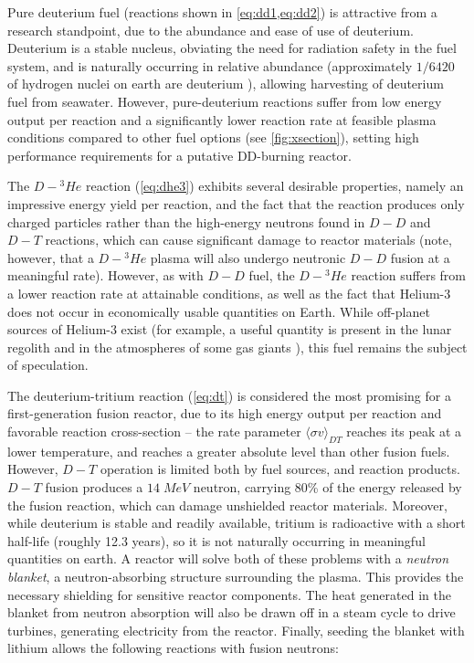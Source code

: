 Pure deuterium fuel (reactions shown in \cref{eq:dd1,eq:dd2}) is attractive from a research standpoint, due to the abundance and ease of use of deuterium.  Deuterium is a stable nucleus, obviating the need for radiation safety in the fuel system, and is naturally occurring in relative abundance (approximately $1/6420$ of hydrogen nuclei on earth are deuterium \cite{CRC}), allowing harvesting of deuterium fuel from seawater.  However, pure-deuterium reactions suffer from low energy output per reaction and a significantly lower reaction rate at feasible plasma conditions compared to other fuel options (see \cref{fig:xsection}), setting high performance requirements for a putative DD-burning reactor.

The $\si{D}-{}^3\si{He}$ reaction (\cref{eq:dhe3}) exhibits several desirable properties, namely an impressive energy yield per reaction, and the fact that the reaction produces only charged particles rather than the high-energy neutrons found in $\si{D}-\si{D}$ and $\si{D}-\si{T}$ reactions, which can cause significant damage to reactor materials (note, however, that a $\si{D}-{}^3\si{He}$ plasma will also undergo neutronic $\si{D}-\si{D}$ fusion at a meaningful rate).  However, as with $\si{D}-\si{D}$ fuel, the $\si{D}-{}^3\si{He}$ reaction suffers from a lower reaction rate at attainable conditions, as well as the fact that Helium-3 does not occur in economically usable quantities on Earth.  While off-planet sources of Helium-3 exist (for example, a useful quantity is present in the lunar regolith \cite{Johnson1999} and in the atmospheres of some gas giants \cite{Palaszewski2005}), this fuel remains the subject of speculation.

The deuterium-tritium reaction (\cref{eq:dt}) is considered the most promising for a first-generation fusion reactor, due to its high energy output per reaction and favorable reaction cross-section -- the rate parameter $\langle \sigma v \rangle_{DT}$ reaches its peak at a lower temperature, and reaches a greater absolute level than other fusion fuels.  However, $\si{D}-\si{T}$ operation is limited both by fuel sources, and reaction products.  $\si{D}-\si{T}$ fusion produces a $14 \;\si{MeV}$ neutron, carrying 80\% of the energy released by the fusion reaction, which can damage unshielded reactor materials.  Moreover, while deuterium is stable and readily available, tritium is radioactive with a short half-life (roughly 12.3 years), so it is not naturally occurring in meaningful quantities on earth.   A reactor will solve both of these problems with a \emph{neutron blanket}, a neutron-absorbing structure surrounding the plasma.  This provides the necessary shielding for sensitive reactor components.  The heat generated in the blanket from neutron absorption will also be drawn off in a steam cycle to drive turbines, generating electricity from the reactor.  Finally, seeding the blanket with lithium allows the following reactions with fusion neutrons:

